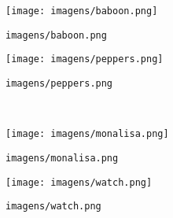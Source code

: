 \begin{subfigure}{0.33\textwidth}
    \centering
    \texttt{[image: imagens/baboon.png]}
    \caption{\texttt{imagens/baboon.png}}
    \label{fig:baboon}
\end{subfigure}%
\begin{subfigure}{0.33\textwidth}
    \centering
    \texttt{[image: imagens/peppers.png]}
    \caption{\texttt{imagens/peppers.png}}
    \label{fig:peppers}
\end{subfigure}\\[8pt]
\begin{subfigure}{0.33\textwidth}
    \centering
    \texttt{[image: imagens/monalisa.png]}
    \caption{\texttt{imagens/monalisa.png}}
    \label{fig:monalisa}
\end{subfigure}%
\begin{subfigure}{0.33\textwidth}
    \centering
    \texttt{[image: imagens/watch.png]}
    \caption{\texttt{imagens/watch.png}}
    \label{fig:watch}
\end{subfigure}